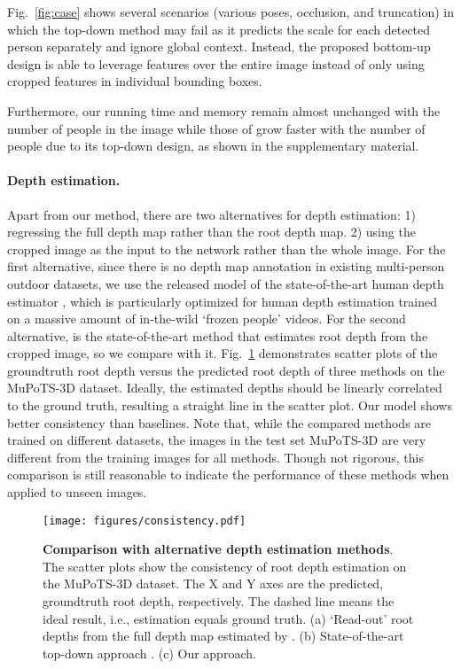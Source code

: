 \documentclass[runningheads]{llncs}
\begin{document}
Fig.~\ref{fig:case} shows several scenarios (various poses, occlusion, and truncation) in which the top-down method \cite{Moon_2019_ICCV_3DMPPE} may fail as it predicts the scale for each detected person separately and ignore global context. Instead, the proposed bottom-up design is able to leverage features over the entire image instead of only using cropped features in individual bounding boxes.

Furthermore, our running time and memory remain almost unchanged with the number of people in the image while those of \cite{Moon_2019_ICCV_3DMPPE} grow faster with the number of people due to its top-down design, as shown in the supplementary material.

\paragraph{\bf Depth estimation.} Apart from our method, there are two alternatives for depth estimation: 1) regressing the full depth map rather than the root depth map. 2) using the cropped image as the input to the network rather than the whole image. For the first alternative, since there is no depth map annotation in existing multi-person outdoor datasets, we use the released model of the state-of-the-art human depth estimator \cite{Li_2019_CVPR}, which is particularly optimized for human depth estimation trained on a massive amount of in-the-wild `frozen people' videos. For the second alternative, \cite{Moon_2019_ICCV_3DMPPE} is the state-of-the-art method that estimates root depth from the cropped image, so we compare with it.
Fig.~\ref{fig:consistency} demonstrates scatter plots of the groundtruth root depth versus the predicted root depth of three methods on the MuPoTS-3D dataset. Ideally, the estimated depths should be linearly correlated to the ground truth, resulting a straight line in the scatter plot. Our model shows better consistency than baselines. Note that, while the compared methods are trained on different datasets, the images in the test set MuPoTS-3D are very different from the training images for all methods. Though not rigorous, this comparison is still reasonable to indicate the performance of these methods when applied to unseen images. 

\begin{figure}[t]
\centering
\texttt{[image: figures/consistency.pdf]}
 \caption{
	 \textbf{Comparison with alternative depth estimation methods}. The scatter plots show the consistency of root depth estimation on the MuPoTS-3D dataset. The X and Y axes are the predicted, groundtruth root depth, respectively. The dashed line means the ideal result, i.e., estimation equals ground truth. (a) `Read-out' root depths from the full depth map estimated by \cite{Li_2019_CVPR}. 
	 (b) State-of-the-art top-down approach \cite{Moon_2019_ICCV_3DMPPE}. 
	 (c) Our approach.
 }
 \label{fig:consistency}
\end{figure}
\end{document}
